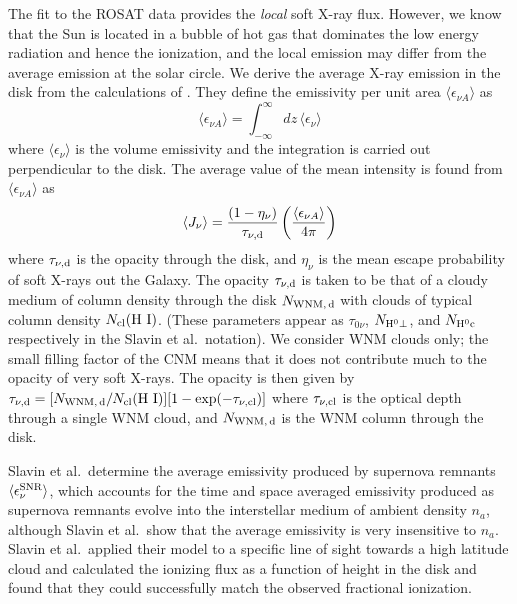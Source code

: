 \documentclass[12pt,preprint,flushrt]{aastex}
\begin{document}
The fit to the ROSAT data provides the {\em local} soft X-ray flux.
However, we know that the Sun is located in a bubble of hot gas that
dominates the low energy radiation and hence the ionization, and the
local emission may differ from the average emission at the solar circle.
We derive the average X-ray emission in the disk from the calculations of
\cite{slav00}. They define the emissivity per unit area
$\langle \epsilon_{\nu A}\rangle$ as
\begin{equation}
    \langle \epsilon_{\nu A}\rangle = \int_{-\infty}^{\infty} dz\,
    \langle \epsilon_\nu \rangle
\end{equation}
where $\langle \epsilon_\nu \rangle$ is the volume emissivity and the
integration is carried out perpendicular to  the disk.
The average value of the mean intensity is found from
$\langle \epsilon_{\nu A}\rangle$ as
\begin{equation}\label{jslavin}
\langle J_{\nu} \rangle = \frac{(1-\eta_\nu)}{\tau_{\nu ,{\rm d}}}\left(
             \frac{\langle \epsilon_{\nu A} \rangle}{4\pi }\right)
\end{equation}
where $\tau_{\nu ,{\rm d}}$ is the opacity through the disk, and $\eta_\nu$
is the mean escape probability of soft X-rays out the Galaxy.
The opacity $\tau_{\nu ,{\rm d}}$ is taken to be that of a cloudy
medium of column density through the disk $N_{\rm WNM,\, d}$
with clouds of typical column density $N_{\rm cl}({\rm H~I})$.
(These parameters appear as $\tau_{0\nu}$, $N_{\rm H^0\perp}$,
and $N_{\rm H^0c}$ respectively in the Slavin et al.\  notation).
We consider WNM clouds only; the small filling factor of the CNM
means that it does not contribute much to the opacity of very soft
X-rays.
The opacity is then given by
$\tau_{\nu ,{\rm d}} =
[N_{\rm WNM,\, d}/N_{\rm cl}({\rm H~I})][1-\exp(-\tau_{\nu, \rm cl})]$
where $\tau_{\nu ,{\rm cl}}$ is the optical depth through a single WNM 
cloud, and $N_{\rm WNM,\, d}$ is the WNM column through the disk.

Slavin et al.\ determine the average emissivity produced
by supernova remnants
$\langle \epsilon_{\nu}^{\rm SNR} \rangle$, which accounts for
the time and space averaged emissivity produced as supernova
remnants evolve into
the interstellar medium of ambient density $n_a$, although
Slavin et al.\  show
that the average emissivity is very insensitive to $n_a$.
Slavin et al.\  applied
their model to  a specific line of sight towards
a high latitude cloud and calculated the ionizing flux as a function
of height in the disk and found that they could successfully
match the observed fractional ionization.
\end{document}
